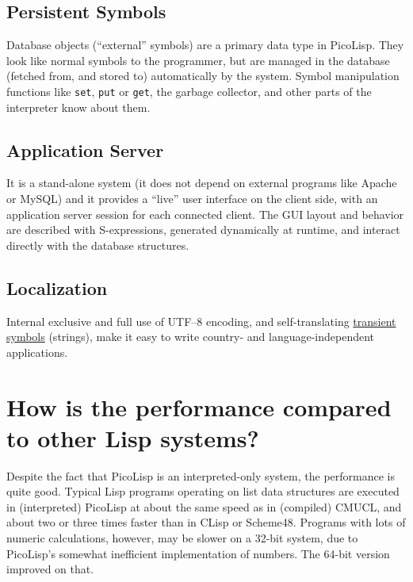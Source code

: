 \subsection{Persistent Symbols}
\label{sec:faq-persistent-symbols}


Database objects (``external'' symbols) are a primary data type in
PicoLisp. They look like normal symbols to the programmer, but are
managed in the database (fetched from, and stored to) automatically by
the system. Symbol manipulation functions like \texttt{set}, \texttt{put} or \texttt{get},
the garbage collector, and other parts of the interpreter know about
them.
\subsection{Application Server}
\label{sec:faq-application-server}


It is a stand-alone system (it does not depend on external programs like
Apache or MySQL) and it provides a ``live'' user interface on the client
side, with an application server session for each connected client. The
GUI layout and behavior are described with S-expressions, generated
dynamically at runtime, and interact directly with the database
structures.
\subsection{Localization}
\label{sec:faq-localization}


Internal exclusive and full use of UTF--8 encoding, and self-translating
\hyperref[ref.html-transient-io]{transient symbols} (strings), make it easy to
write country- and language-independent applications.

 
\section{How is the performance compared to other Lisp systems?}
\label{sec:faq-how-is-the-performance-compared-to-other-lisp-systems?}


Despite the fact that PicoLisp is an interpreted-only system, the
performance is quite good. Typical Lisp programs operating on list data
structures are executed in (interpreted) PicoLisp at about the same
speed as in (compiled) CMUCL, and about two or three times faster than
in CLisp or Scheme48. Programs with lots of numeric calculations,
however, may be slower on a 32-bit system, due to PicoLisp's somewhat
inefficient implementation of numbers. The 64-bit version improved on
that.

